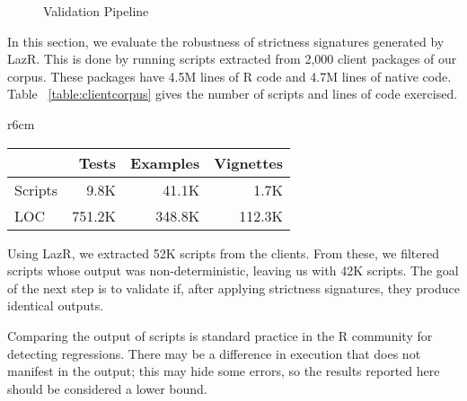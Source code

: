 \documentclass[review,nonacm,screen,acmsmall,anonymous=true]{acmart}
\newcommand{\lazr}{{\sf LazR}\xspace}
\begin{document}
\begin{figure}[th!]
{
  }
  \caption{Validation Pipeline}\label{fig:validationPipeline}
\end{figure}

In this section, we evaluate the robustness of strictness signatures generated
by \lazr. This is done by running scripts extracted from 2,000 client packages of
our corpus. These packages have 4.5M lines of R code and 4.7M lines of native
code. Table ~\ref{table:clientcorpus} gives the number of scripts and lines of code
exercised.

\begin{wraptable}{r}{6cm}  \vspace{-3mm}  \small  \centering
  \caption{Client Corpus}\label{table:clientcorpus}  \vspace{-3mm}
  \begin{tabular}{lrrr}    \toprule
    &\bf Tests&\bf Examples&\bf Vignettes\\
    \midrule
    {Scripts} &9.8K&41.1K&1.7K\\
    \midrule
    {LOC} &751.2K&348.8K&112.3K\\    \bottomrule
  \end{tabular}
\end{wraptable}%

Using \lazr, we extracted 52K scripts from the clients. From these, we filtered
scripts whose output was non-deterministic, leaving us with 42K scripts. The
goal of the next step is to validate if, after applying strictness signatures,
they produce identical outputs.

Comparing the output of scripts is standard practice in the R community for
detecting regressions. There may be a difference in execution that does not
manifest in the output; this may hide some errors, so the results reported here
should be considered a lower bound.
\end{document}
